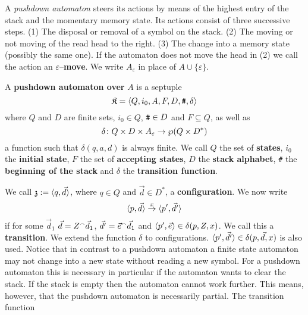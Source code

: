 A {\it pushdown automaton\/} steers its actions by means of
the highest entry of the stack and the momentary memory state.
Its actions consist of three successive steps.
(1) The disposal or removal of a symbol on the stack.
(2) The moving or not moving of the read head to the right.
(3) The change into a memory state (possibly the same one).
If the automaton does not move the head in (2) we call the
action an $\varepsilon$--\textbf{move}.
We write $A_{\varepsilon}$ in place of $A \cup \{\varepsilon\}$.
\begin{defn}
A \textbf{pushdown automaton over} $A$ is a septuple
\begin{equation}
\mathfrak{K} = \langle Q, i_0, A, F, D, \mbox{\tt \#}, \delta\rangle
\end{equation}
where $Q$ and $D$ are finite sets, $i_0 \in Q$, $\mbox{\tt \#} \in D$ 
and $F \subseteq Q$, as well as 
\begin{equation}
\delta \colon Q \times D \times A_{\varepsilon} \rightarrow \wp(Q \times D^{\ast})
\end{equation}
a function such that $\delta(q,a,d)$ is always finite. We call $Q$ 
the set of \textbf{states}, $i_0$ the \textbf{initial state}, $F$ 
the set of \textbf{accepting states}, $D$ the \textbf{stack alphabet}, 
{\tt \#} the \textbf{beginning of the stack} and $\delta$ the 
\textbf{transition function}.
\end{defn}
We call $\mathfrak{z} := \langle q, \vec{d}\rangle$, where $q \in Q$ and $\vec{d}
\in D^{\ast}$, a \textbf{configuration}. We now write
\begin{equation}
\langle p, \vec{d}\rangle \stackrel{x}{\rightarrow} \langle p', \vec{d'}\rangle
\end{equation}
if for some $\vec{d}_1$ $\vec{d} =  Z {^{\smallfrown}} \vec{d}_1$, $\vec{d'} =
\vec{e} {^{\smallfrown}} \vec{d}_1$ and $\langle p', \vec{e}\rangle \in
\delta(p,Z,x)$. We call this a \textbf{transition}.
We extend the function $\delta$ to configurations. $\langle p',\vec{d'}\rangle 
\in \delta(p, \vec{d}, x)$ is also used. Notice that in contrast to a 
pushdown automaton a 
finite state automaton may not change into a new state without reading 
a new symbol. For a pushdown automaton this is necessary in particular 
if the automaton wants to clear the stack. If the stack is empty then the
automaton cannot work further. This means, however, that the
pushdown automaton is necessarily partial. The transition function
